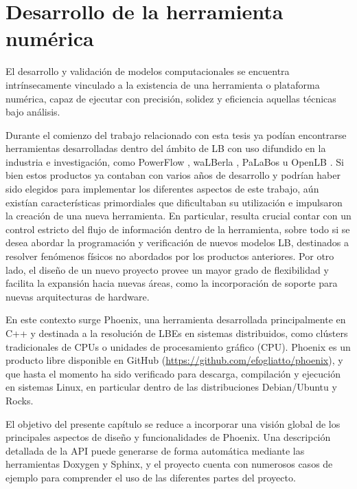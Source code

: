\chapter{Desarrollo de la herramienta num\'erica}

El desarrollo y validaci\'on de modelos computacionales se encuentra intr\'insecamente vinculado a la existencia de una herramienta o plataforma num\'erica, capaz de ejecutar con precisi\'on, solidez y eficiencia aquellas t\'ecnicas bajo an\'alisis. 

Durante el comienzo del trabajo relacionado con esta tesis ya pod\'ian encontrarse herramientas desarrolladas dentro del \'ambito de LB con uso difundido en la industria e investigaci\'on, como PowerFlow \cite{noauthor_powerflow_nodate}, waLBerla \cite{noauthor_walberla_nodate}, PaLaBos \cite{latt_palabos_2020} u OpenLB \cite{noauthor_openlb_nodate}. Si bien estos productos ya contaban con varios a\~nos de desarrollo y podr\'ian haber sido elegidos para implementar los diferentes aspectos de este trabajo, a\'un exist\'ian caracter\'isticas primordiales que dificultaban su utilizaci\'on e impulsaron la creaci\'on de una nueva herramienta. En particular, resulta crucial contar con un control estricto del flujo de informaci\'on dentro de la herramienta, sobre todo si se desea abordar la programaci\'on y verificaci\'on de nuevos modelos LB, destinados a resolver fen\'omenos f\'isicos no abordados por los productos anteriores. Por otro lado, el dise\~no de un nuevo proyecto provee un mayor grado de flexibilidad y facilita la expansi\'on hacia nuevas \'areas, como la incorporaci\'on de soporte para nuevas arquitecturas de hardware.

En este contexto surge Phoenix, una herramienta desarrollada principalmente en C++ y destinada a la resoluci\'on de LBEs en sistemas distribuidos, como cl\'usters tradicionales de CPUs o unidades de procesamiento gr\'afico (CPU). Phoenix es un producto libre disponible en GitHub (\url{https://github.com/efogliatto/phoenix}), y que hasta el momento ha sido verificado para descarga, compilaci\'on y ejecuci\'on en sistemas Linux, en particular dentro de las distribuciones Debian/Ubuntu y Rocks. 

El objetivo del presente cap\'itulo se reduce a incorporar una visi\'on global de los principales aspectos de dise\~no y funcionalidades de Phoenix. Una descripci\'on detallada de la API puede generarse de forma autom\'atica mediante las herramientas Doxygen y Sphinx, y el proyecto cuenta con numerosos casos de ejemplo para comprender el uso de las diferentes partes del proyecto.



